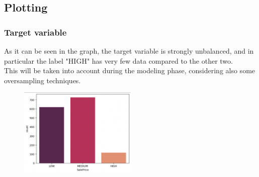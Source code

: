 \subsection{Plotting}

\subsubsection*{Target variable}
As it can be seen in the graph, the target variable is strongly unbalanced, and in particular the label "HIGH" has very few data compared to the other two.\\
This will be taken into account during the modeling phase, considering also some oversampling techniques.
\begin{figure}[h!]
    \centering
    \includegraphics[width=0.5\textwidth]{imgs/SalePrice.png}
    \caption{}
    \label{SalePrice distribution}
\end{figure}

